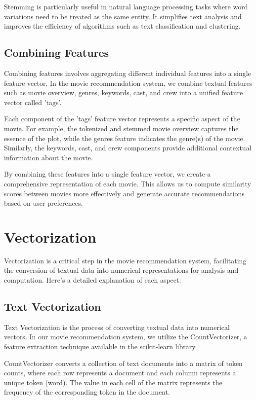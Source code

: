 \documentclass{article}
\begin{document}
\begin{itemize}
Stemming is particularly useful in natural language processing tasks where word variations need to be treated as the same entity. It simplifies text analysis and improves the efficiency of algorithms such as text classification and clustering.

\subsection{Combining Features}
Combining features involves aggregating different individual features into a single feature vector. In the movie recommendation system, we combine textual features such as movie overview, genres, keywords, cast, and crew into a unified feature vector called 'tags'.

Each component of the 'tags' feature vector represents a specific aspect of the movie. For example, the tokenized and stemmed movie overview captures the essence of the plot, while the genres feature indicates the genre(s) of the movie. Similarly, the keywords, cast, and crew components provide additional contextual information about the movie.

By combining these features into a single feature vector, we create a comprehensive representation of each movie. This allows us to compute similarity scores between movies more effectively and generate accurate recommendations based on user preferences.

\end{itemize}

\section{Vectorization}
Vectorization is a critical step in the movie recommendation system, facilitating the conversion of textual data into numerical representations for analysis and computation. Here's a detailed explanation of each aspect:

\subsection{Text Vectorization}
Text Vectorization is the process of converting textual data into numerical vectors. In our movie recommendation system, we utilize the CountVectorizer, a feature extraction technique available in the scikit-learn library. 

CountVectorizer converts a collection of text documents into a matrix of token counts, where each row represents a document and each column represents a unique token (word). The value in each cell of the matrix represents the frequency of the corresponding token in the document.
\end{document}
